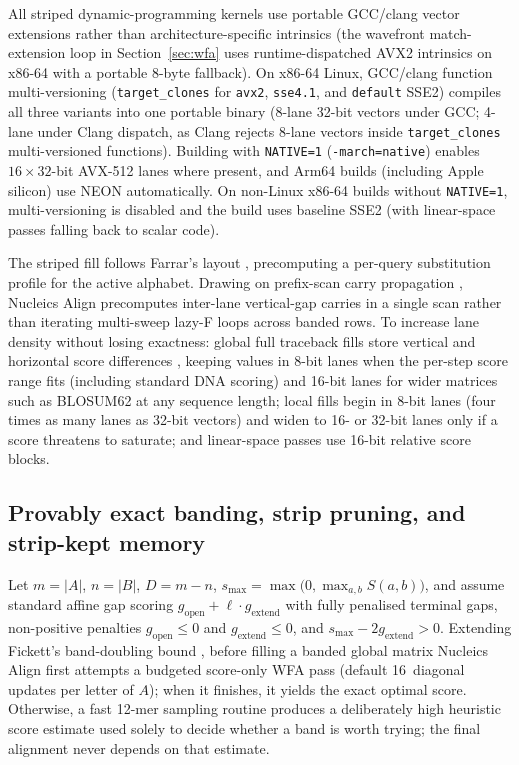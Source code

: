 \documentclass[11pt,a4paper]{article}
\begin{document}
All striped dynamic-programming kernels use portable GCC/clang vector extensions rather than architecture-specific intrinsics (the wavefront match-extension loop in Section~\ref{sec:wfa} uses runtime-dispatched AVX2 intrinsics on x86-64 with a portable 8-byte fallback). On x86-64 Linux, GCC/clang function multi-versioning (\texttt{target\_clones} for \texttt{avx2}, \texttt{sse4.1}, and \texttt{default} SSE2) compiles all three variants into one portable binary (8-lane 32-bit vectors under GCC; 4-lane under Clang dispatch, as Clang rejects 8-lane vectors inside \texttt{target\_clones} multi-versioned functions). Building with \texttt{NATIVE=1} (\texttt{-march=native}) enables $16 \times 32$-bit AVX-512 lanes where present, and Arm64 builds (including Apple silicon) use NEON automatically. On non-Linux x86-64 builds without \texttt{NATIVE=1}, multi-versioning is disabled and the build uses baseline SSE2 (with linear-space passes falling back to scalar code).

The striped fill follows Farrar's layout \citep{farrar2007striped}, precomputing a per-query substitution profile for the active alphabet. Drawing on prefix-scan carry propagation \citep{khajehsaeed2010acceleration,daily2016parasail,liu2023block}, Nucleics Align precomputes inter-lane vertical-gap carries in a single scan rather than iterating multi-sweep lazy-F loops across banded rows. To increase lane density without losing exactness: global full traceback fills store vertical and horizontal score differences \citep{suzuki2018introducing}, keeping values in 8-bit lanes when the per-step score range fits (including standard DNA scoring) and 16-bit lanes for wider matrices such as BLOSUM62 at any sequence length; local fills begin in 8-bit lanes (four times as many lanes as 32-bit vectors) and widen to 16- or 32-bit lanes only if a score threatens to saturate; and linear-space passes use 16-bit relative score blocks.

\subsection{Provably exact banding, strip pruning, and strip-kept memory}
\label{sec:banding}

Let $m = |A|$, $n = |B|$, $D = m - n$, $s_{\max} = \max\big(0, \max_{a,b} S(a,b)\big)$, and assume standard affine gap scoring $g_{\text{open}} + \ell \cdot g_{\text{extend}}$ with fully penalised terminal gaps, non-positive penalties $g_{\text{open}} \le 0$ and $g_{\text{extend}} \le 0$, and $s_{\max} - 2 g_{\text{extend}} > 0$. Extending Fickett's band-doubling bound \citep{fickett1984fast}, before filling a banded global matrix Nucleics Align first attempts a budgeted score-only WFA pass \citep{marcosola2021fast} (default 16~diagonal updates per letter of $A$); when it finishes, it yields the exact optimal score. Otherwise, a fast 12-mer sampling routine produces a deliberately high heuristic score estimate used solely to decide whether a band is worth trying; the final alignment never depends on that estimate.
\end{document}
